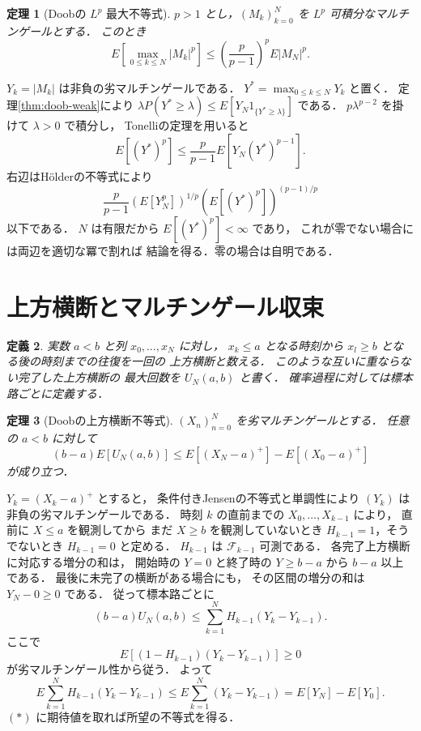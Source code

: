 \documentclass[a5paper,10pt,onecolumn]{jsarticle}
\makeatletter
\theoremstyle{mathnotetheorem}
\newtheorem{theorem}{定理}[section]
\newtheorem{definition}[theorem]{定義}
\renewcommand{\proofname}{証明}
\renewenvironment{proof}[1][\proofname]{%
  \par\pushQED{\qed}\normalfont\topsep4\p@\@plus2\p@\relax
  \trivlist\item[\hskip\labelsep\bfseries #1]\ignorespaces
}{\popQED\endtrivlist\@endpefalse}
\makeatother
\begin{document}
\begin{theorem}[Doobの $L^p$ 最大不等式]\label{thm:doob-lp}
$p>1$ とし，$(M_k)_{k=0}^N$ を
$L^p$ 可積分なマルチンゲールとする．
このとき
\[
 E\left[\max_{0\le k\le N}|M_k|^p\right]
 \le \left(\frac{p}{p-1}\right)^p E|M_N|^p.
\]
\end{theorem}
\begin{proof}
$Y_k=|M_k|$ は非負の劣マルチンゲールである．
$Y^*=\max_{0\le k\le N}Y_k$ と置く．
定理\ref{thm:doob-weak}により
$\lambda P(Y^*\ge\lambda)
 \le E[Y_N1_{\{Y^*\ge\lambda\}}]$ である．
$p\lambda^{p-2}$ を掛けて $\lambda>0$ で積分し，
Tonelliの定理を用いると
\[
 E[(Y^*)^p]
 \le \frac{p}{p-1}E[Y_N(Y^*)^{p-1}].
\]
右辺はH\"olderの不等式により
\[
 \frac{p}{p-1}
 (E[Y_N^p])^{1/p}
 (E[(Y^*)^p])^{(p-1)/p}
\]
以下である．
$N$ は有限だから $E[(Y^*)^p]<\infty$ であり，
これが零でない場合には両辺を適切な冪で割れば
結論を得る．零の場合は自明である．
\end{proof}

\section{上方横断とマルチンゲール収束}

\begin{definition}
実数 $a<b$ と列 $x_0,\dots,x_N$ に対し，
$x_k\le a$ となる時刻から
$x_l\ge b$ となる後の時刻までの往復を一回の
\emph{上方横断}と数える．
このような互いに重ならない完了した上方横断の
最大回数を $U_N(a,b)$ と書く．
確率過程に対しては標本路ごとに定義する．
\end{definition}

\begin{theorem}[Doobの上方横断不等式]\label{thm:upcrossing}
$(X_n)_{n=0}^N$ を劣マルチンゲールとする．
任意の $a<b$ に対して
\[
 (b-a)E[U_N(a,b)]
 \le E[(X_N-a)^+]-E[(X_0-a)^+]
\]
が成り立つ．
\end{theorem}
\begin{proof}
$Y_k=(X_k-a)^+$ とすると，
条件付きJensenの不等式と単調性により
$(Y_k)$ は非負の劣マルチンゲールである．
時刻 $k$ の直前までの $X_0,\dots,X_{k-1}$ により，
直前に $X\le a$ を観測してから
まだ $X\ge b$ を観測していないとき
$H_{k-1}=1$，そうでないとき $H_{k-1}=0$ と定める．
$H_{k-1}$ は $\mathcal F_{k-1}$ 可測である．
各完了上方横断に対応する増分の和は，
開始時の $Y=0$ と終了時の $Y\ge b-a$ から
$b-a$ 以上である．
最後に未完了の横断がある場合にも，
その区間の増分の和は $Y_N-0\ge0$ である．
従って標本路ごとに
\[
 (b-a)U_N(a,b)
 \le\sum_{k=1}^N H_{k-1}(Y_k-Y_{k-1}).
 \tag{$*$}
\]
ここで
\[
 E[(1-H_{k-1})(Y_k-Y_{k-1})]\ge0
\]
が劣マルチンゲール性から従う．
よって
\[
 E\sum_{k=1}^NH_{k-1}(Y_k-Y_{k-1})
 \le E\sum_{k=1}^N(Y_k-Y_{k-1})
 =E[Y_N]-E[Y_0].
\]
$(*)$ に期待値を取れば所望の不等式を得る．
\end{proof}
\end{document}
